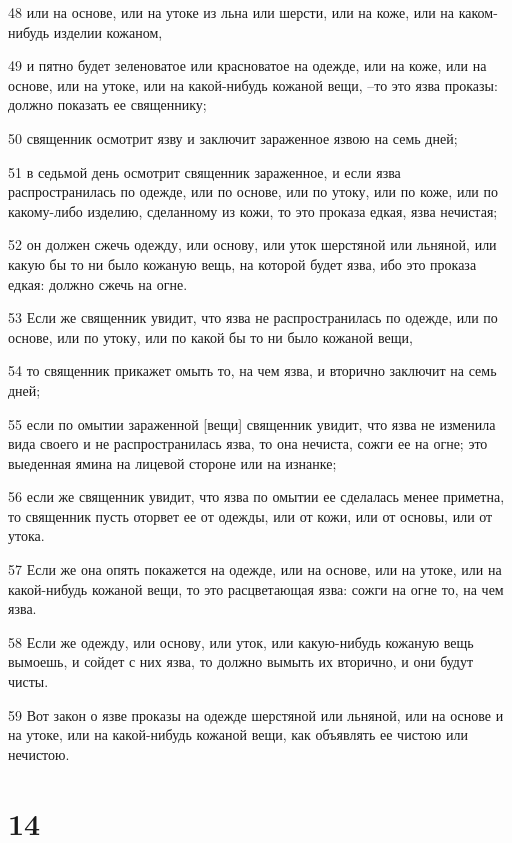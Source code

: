 \par 48 или на основе, или на утоке из льна или шерсти, или на коже, или на каком-нибудь изделии кожаном,
\par 49 и пятно будет зеленоватое или красноватое на одежде, или на коже, или на основе, или на утоке, или на какой-нибудь кожаной вещи, --то это язва проказы: должно показать ее священнику;
\par 50 священник осмотрит язву и заключит зараженное язвою на семь дней;
\par 51 в седьмой день осмотрит священник зараженное, и если язва распространилась по одежде, или по основе, или по утоку, или по коже, или по какому-либо изделию, сделанному из кожи, то это проказа едкая, язва нечистая;
\par 52 он должен сжечь одежду, или основу, или уток шерстяной или льняной, или какую бы то ни было кожаную вещь, на которой будет язва, ибо это проказа едкая: должно сжечь на огне.
\par 53 Если же священник увидит, что язва не распространилась по одежде, или по основе, или по утоку, или по какой бы то ни было кожаной вещи,
\par 54 то священник прикажет омыть то, на чем язва, и вторично заключит на семь дней;
\par 55 если по омытии зараженной [вещи] священник увидит, что язва не изменила вида своего и не распространилась язва, то она нечиста, сожги ее на огне; это выеденная ямина на лицевой стороне или на изнанке;
\par 56 если же священник увидит, что язва по омытии ее сделалась менее приметна, то священник пусть оторвет ее от одежды, или от кожи, или от основы, или от утока.
\par 57 Если же она опять покажется на одежде, или на основе, или на утоке, или на какой-нибудь кожаной вещи, то это расцветающая язва: сожги на огне то, на чем язва.
\par 58 Если же одежду, или основу, или уток, или какую-нибудь кожаную вещь вымоешь, и сойдет с них язва, то должно вымыть их вторично, и они будут чисты.
\par 59 Вот закон о язве проказы на одежде шерстяной или льняной, или на основе и на утоке, или на какой-нибудь кожаной вещи, как объявлять ее чистою или нечистою.

\chapter{14}

